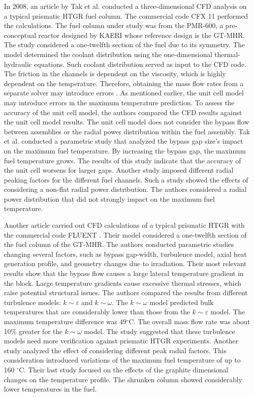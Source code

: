 In 2008, an article by Tak et al. \cite{tak_numerical_2008} conducted  a three-dimensional \gls{CFD} analysis on a typical prismatic \gls{HTGR} fuel column.
The commercial code CFX 11 \cite{ansys_incorporated_cfx_2006} performed the calculations.
The fuel column under study was from the PMR-600, a pre-conceptual reactor designed by \gls{KAERI} whose reference design is the GT-MHR.
The study considered a one-twelfth section of the fuel due to its symmetry.
The model determined the coolant distribution using the one-dimensional thermal-hydraulic equations.
Such coolant distribution served as input to the CFD code.
The friction in the channels is dependent on the viscosity, which is highly dependent on the temperature.
Therefore, obtaining the mass flow rates from a separate solver may introduce errors \cite{sato_computational_2010}.
As mentioned earlier, the unit cell model may introduce errors in the maximum temperature prediction.
To assess the accuracy of the unit cell model, the authors compared the CFD results against the unit cell model results.
The unit cell model does not consider the bypass flow between assemblies or the radial power distribution within the fuel assembly.
Tak et al. conducted a parametric study that analyzed the bypass gap size's impact on the maximum fuel temperature.
By increasing the bypass gap, the maximum fuel temperature grows.
The results of this study indicate that the accuracy of the unit cell worsens for larger gaps.
Another study imposed different radial peaking factors for the different fuel channels.
Such a study showed the effects of considering a non-flat radial power distribution.
The authors considered a radial power distribution that did not strongly impact on the maximum fuel temperature.

Another article \cite{sato_computational_2010} carried out \gls{CFD} calculations of a typical prismatic \gls{HTGR} with the commercial code FLUENT \cite{fluent_inc_fluent_2006}.
Their model considered a one-twelfth section of the fuel column of the GT-MHR.
The authors conducted parametric studies changing several factors, such as bypass gap-width, turbulence model, axial heat generation profile, and geometry changes due to irradiation.
Their most relevant results show that the bypass flow causes a large lateral temperature gradient in the block.
Large temperature gradients cause excessive thermal stresses, which raise potential structural issues.
The authors compared the results from different turbulence models: $k \sim \varepsilon$ and $k \sim \omega$.
The $k \sim \omega$ model predicted bulk temperatures that are considerably lower than those from the $k \sim \varepsilon$ model.
The maximum temperature difference was 49$^{\circ}$C.
The overall mass flow rate was about 10$\%$ greater for the $k \sim \omega$ model.
The study suggested that these turbulence models need more verification against prismatic \gls{HTGR} experiments.
Another study analyzed the effect of considering different peak radial factors.
This consideration introduced variations of the maximum fuel temperature of up to 160 $^{\circ}$C.
Their last study focused on the effects of the graphite dimensional changes on the temperature profile.
The shrunken column showed considerably lower temperatures in the fuel.


